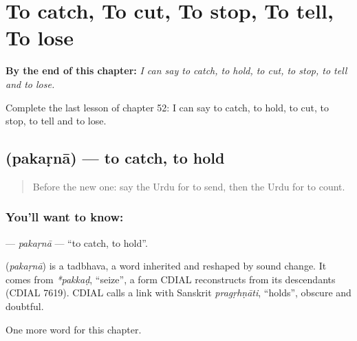 
\chapter{To catch, To cut, To stop, To tell, To lose}
\label{ch:ur-to-catch-to-cut-to-stop-to-tell-to-lose}

\begin{chapteropening}
\textbf{By the end of this chapter:} \emph{I can say to catch, to hold, to cut, to stop, to tell and to lose.}

Complete the last lesson of chapter 52: I can say to catch, to hold, to cut, to stop, to tell and to lose.
\end{chapteropening}

\section[\texorpdfstring{\ur{پکڑنا} (pakaṛnā)}{پکڑنا (pakaṛnā)}]{ (pakaṛnā) — to catch, to hold}

\label{lesson:UR-C52-pakarna}



\begin{quote}
Before the new one: say the Urdu for to send, then the Urdu for to count.
\end{quote}

\subsection*{You'll want to know: }
\textbf{} — \emph{pakaṛnā} — \textquotedblleft{}to catch, to hold\textquotedblright{}.

\begin{cousinweb}
\textbf{} (\emph{pakaṛnā}) is a tadbhava, a word inherited and reshaped by sound change. It comes from \emph{*pakkaḍ}, \textquotedblleft{}seize\textquotedblright{}, a form CDIAL reconstructs from its descendants (CDIAL 7619). CDIAL calls a link with Sanskrit \emph{pragṛhṇāti}, \textquotedblleft{}holds\textquotedblright{}, obscure and doubtful.
\end{cousinweb}

\begin{grammarlens}[title={What you've built}]
One more word for this chapter.
\end{grammarlens}

